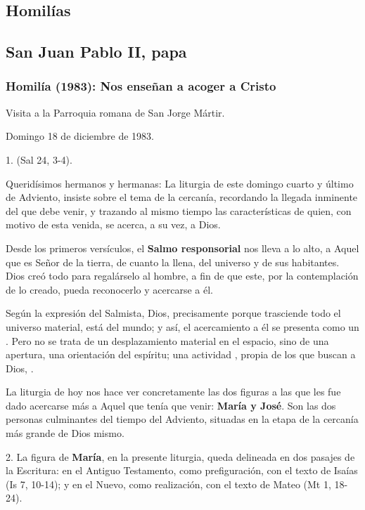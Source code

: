 \begin{body}
\begin{body}
\section{Homilías}

\subsection{San Juan Pablo II, papa}

\subsubsection{Homilía (1983): Nos enseñan a acoger a Cristo}

Visita a la Parroquia romana de San Jorge Mártir.

Domingo 18 de diciembre de 1983.

1.  (Sal 24, 3-4).

Queridísimos hermanos y hermanas: La liturgia de este domingo cuarto y último de Adviento, insiste sobre el tema de la cercanía, recordando la llegada inminente del que debe venir, y trazando al mismo tiempo las características de quien, con motivo de esta venida, se acerca, a su vez, a Dios.

Desde los primeros versículos, el \textbf{Salmo responsorial} nos lleva a lo alto, a Aquel que es Señor de la tierra, de cuanto la llena, del universo y de sus habitantes. Dios creó todo para regalárselo al hombre, a fin de que este, por la contemplación de lo creado, pueda reconocerlo y acercarse a él.

Según la expresión del Salmista, Dios, precisamente porque trasciende todo el universo material, está  del mundo; y así, el acercamiento a él se presenta como un . Pero no se trata de un desplazamiento material en el espacio, sino de una apertura, una orientación del espíritu; una actividad , propia de los que buscan a Dios, .

La liturgia de hoy nos hace ver concretamente las dos figuras a las que les fue dado acercarse más a Aquel que tenía que venir: \textbf{María y José}. Son las dos personas culminantes del tiempo del Adviento, situadas en la etapa de la cercanía más grande de Dios mismo.

2. La figura de \textbf{María}, en la presente liturgia, queda delineada en dos pasajes de la Escritura: en el Antiguo Testamento, como prefiguración, con el texto de Isaías (Is 7, 10-14); y en el Nuevo, como realización, con el texto de Mateo (Mt 1, 18-24).


\end{body}
\end{body}
